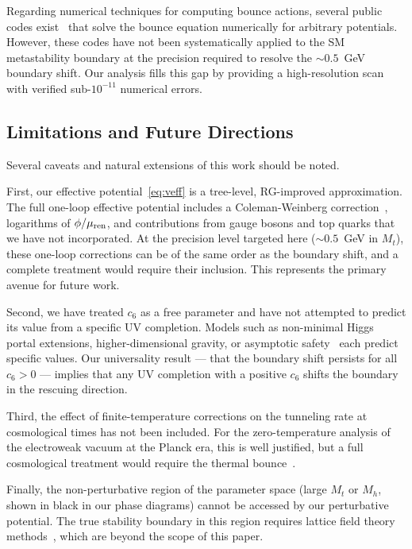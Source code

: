 \documentclass[aps,prd,twocolumn,superscriptaddress,nofootinbib]{revtex4-2}
\begin{document}
Regarding numerical techniques for computing bounce actions, several
public codes exist~\cite{CosmoTransitions,BubbleProfiler,AnyBubble}
that solve the bounce equation numerically for arbitrary potentials.
However, these codes have not been systematically applied to the SM
metastability boundary at the precision required to resolve the
$\sim 0.5$~GeV boundary shift. Our analysis fills this gap by providing
a high-resolution scan with verified sub-$10^{-11}$ numerical errors.

\subsection{Limitations and Future Directions}
\label{subsec:limitations}

Several caveats and natural extensions of this work should be noted.

First, our effective potential~\eqref{eq:veff} is a tree-level, RG-improved
approximation. The full one-loop effective potential includes a
Coleman-Weinberg correction~\cite{Coleman:1973jx}, logarithms of
$\phi/\mu_{\rm ren}$, and contributions from gauge bosons and top quarks
that we have not incorporated. At the precision level targeted here
($\sim 0.5$~GeV in $M_t$), these one-loop corrections can be of the same
order as the boundary shift, and a complete treatment would require
their inclusion. This represents the primary avenue for future work.

Second, we have treated $c_6$ as a free parameter and have not attempted
to predict its value from a specific UV completion. Models such as
non-minimal Higgs portal extensions, higher-dimensional gravity, or
asymptotic safety~\cite{Eichhorn:2017ylw} each predict specific values.
Our universality result — that the boundary shift persists for all $c_6 > 0$
— implies that any UV completion with a positive $c_6$ shifts the boundary
in the rescuing direction.

Third, the effect of finite-temperature corrections on the tunneling rate
at cosmological times has not been included. For the zero-temperature
analysis of the electroweak vacuum at the Planck era, this is well
justified, but a full cosmological treatment would require the
thermal bounce~\cite{Linde:1980tt,Linde:1981zj}.

Finally, the non-perturbative region of the parameter space (large $M_t$
or $M_h$, shown in black in our phase diagrams) cannot be accessed by our
perturbative potential. The true stability boundary in this region requires
lattice field theory methods~\cite{Gould:2019qek}, which are beyond the
scope of this paper.
\end{document}
